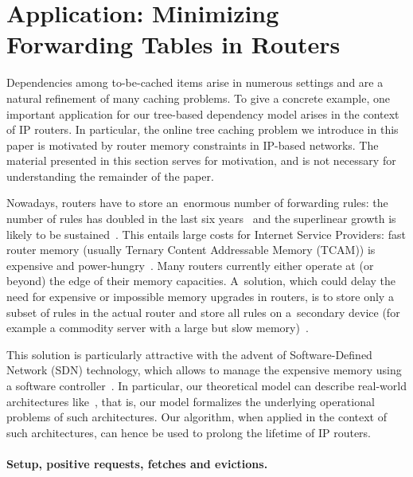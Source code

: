 \documentclass[sigconf,screen=true]{acmart}
\begin{document}
\section{Application: Minimizing Forwarding Tables in Routers}
\label{sec:motivation}

Dependencies among to-be-cached items arise in numerous settings and are a
natural refinement of many caching problems. To give a concrete example, one
important application for our tree-based dependency model arises in the context
of IP routers. In particular, the online tree caching problem we introduce in
this paper is motivated by router memory constraints in IP-based networks. The
material presented in this section serves for motivation, and is not necessary
for understanding the remainder of the paper.

Nowadays, routers have to store an~enormous number of forwarding rules: the
number of rules has doubled in the last six years~\cite{bgp-routeviews} and
the superlinear growth is likely to be sustained~\cite{steve-myth}. This
entails large costs for Internet Service Providers: fast router memory
(usually Ternary Content Addressable Memory (TCAM)) is expensive and
power-hungry~\cite{tcam-expensive}.  Many routers currently either operate at
(or beyond) the edge of their memory capacities. A~solution, which could delay
the need for expensive or impossible memory upgrades in routers, is to store
only a subset of rules in the actual router and store all rules on a~secondary
device (for example a commodity server with a large but slow
memory)~\cite{cacheflow,route-caching-flat,prefix-caching,fib-caching-non-overlapping,fibium-zipf}.

This solution is particularly attractive with the advent of Soft\-ware-Defined
Network (SDN) technology, which allows to manage the expensive memory using a
software controller~\cite{cacheflow,fibium-zipf}. In particular, our
theoretical model can describe real-world architectures
like~\cite{cacheflow,fibium-zipf},
that is, our model formalizes the underlying operational
problems of such architectures. Our 
algorithm, when applied in the context of such architectures, can 
hence be used to prolong the lifetime of IP routers.

\paragraph{Setup, positive requests, fetches and evictions.}
\end{document}
